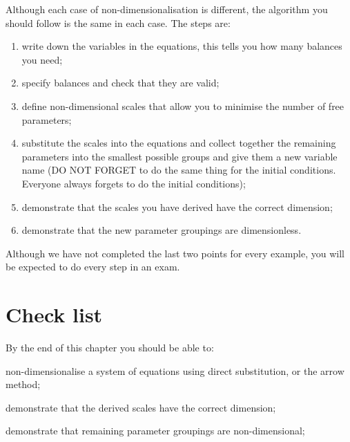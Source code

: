 Although each case of non-dimensionalisation is different, the algorithm you should follow is the same in each case. The steps are:
\begin{enumerate}
\item write down the variables in the equations, this tells you how many balances you need;
\item specify balances and check that they are valid;
\item define non-dimensional scales that allow you to minimise the number of free parameters;
\item substitute the scales into the equations and collect together the remaining parameters into the smallest possible groups and give them a new variable name (DO NOT FORGET to do the same thing for the initial conditions. Everyone always forgets to do the initial conditions);
\item demonstrate that the scales you have derived have the correct dimension;
\item demonstrate that the new parameter groupings are dimensionless.
\end{enumerate}
Although we have not completed the last two points for every example, you will be expected to do every step in an exam.
%
%

\section{Check list}
By the end of this chapter you should be able to:
\begin{todolist}
\item non-dimensionalise a system of equations using direct substitution, or the arrow method;
\item demonstrate that the derived scales have the correct dimension;
\item demonstrate that remaining parameter groupings are non-dimensional;
\end{todolist}




